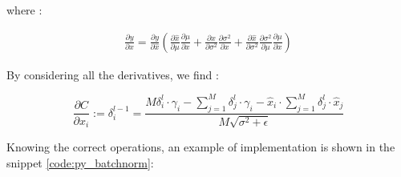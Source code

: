 \documentclass[12pt,a4paper]{report}
\begin{document}
where : 

\begin{align}
 \frac{\partial y}{\partial x} = \frac{\partial y}{\partial \hat x} 
 (\frac{\partial \hat x}{\partial \mu}\frac{\partial \mu}{\partial x} + 
  \frac{\partial \hat x}{\partial \sigma^2}\frac{\partial \sigma^2}{\partial x} +
\frac{\partial \hat x}{\partial \sigma^2}\frac{\partial \sigma^2}{\partial \mu}\frac{\partial \mu}{\partial x})
\end{align}

By considering all the derivatives, we find :

\begin{equation}
 \frac{\partial C}{\partial x_i} := \delta^{l-1}_i = 
 \frac{M\delta^l_i \cdot \gamma_i - \sum_{j=1}^{M} \delta^l_j \cdot \gamma_i - \hat x_i \cdot \sum_{j=1}^{M} \delta^l_j \cdot \hat x_j}
 {M\sqrt{\sigma^2 + \epsilon}}
\end{equation}

Knowing the correct operations, an example of implementation is shown in the snippet \ref{code:py_batchnorm}: 
\end{document}
